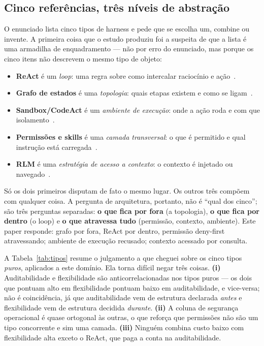 \documentclass[10pt,twocolumn]{article}
\begin{document}
\subsection{Cinco referências, três níveis de abstração}

O enunciado lista cinco tipos de harness e pede que se escolha um, combine ou invente. A
primeira coisa que o estudo produziu foi a suspeita de que a lista é uma armadilha de
enquadramento --- não por erro do enunciado, mas porque os cinco itens não descrevem o mesmo
tipo de objeto:

\begin{itemize}\itemsep2pt
\item \textbf{ReAct} é um \emph{loop}: uma regra sobre como intercalar raciocínio e
ação~\cite{yao2023react}.
\item \textbf{Grafo de estados} é uma \emph{topologia}: quais etapas existem e como se
ligam~\cite{langchain2026langgraph}.
\item \textbf{Sandbox/CodeAct} é um \emph{ambiente de execução}: onde a ação roda e com que
isolamento~\cite{wang2024codeact}.
\item \textbf{Permissões e skills} é uma \emph{camada transversal}: o que é permitido e qual
instrução está carregada~\cite{anthropic2026permissions}.
\item \textbf{RLM} é uma \emph{estratégia de acesso a contexto}: o contexto é injetado ou
navegado~\cite{zhang2025rlm}.
\end{itemize}

Só os dois primeiros disputam de fato o mesmo lugar. Os outros três compõem com qualquer
coisa. A pergunta de arquitetura, portanto, não é ``qual dos cinco''; são três perguntas
separadas: \textbf{o que fica por fora} (a topologia), \textbf{o que fica por dentro} (o
loop) e \textbf{o que atravessa tudo} (permissão, contexto, ambiente). Este paper responde:
grafo por fora, ReAct por dentro, permissão deny-first atravessando; ambiente de execução
recusado; contexto acessado por consulta.

A Tabela~\ref{tab:tipos} resume o julgamento a que cheguei sobre os cinco tipos
\emph{puros}, aplicados a este domínio. Ela torna difícil negar três coisas.
\textbf{(i)} Auditabilidade e flexibilidade são anticorrelacionadas nos tipos puros --- os
dois que pontuam alto em flexibilidade pontuam baixo em auditabilidade, e vice-versa; não é
coincidência, já que auditabilidade vem de estrutura declarada \emph{antes} e flexibilidade
vem de estrutura decidida \emph{durante}. \textbf{(ii)} A coluna de segurança operacional é
quase ortogonal às outras, o que reforça que permissões não são um tipo concorrente e sim
uma camada. \textbf{(iii)} Ninguém combina custo baixo com flexibilidade alta exceto o
ReAct, que paga a conta na auditabilidade.
\end{document}
